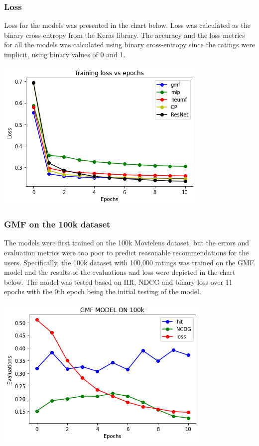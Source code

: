 \documentclass{article}
\begin{document}
\subsubsection{Loss}
Loss for the models was presented in the chart below. Loss was calculated as the binary cross-entropy from the Keras library. The accuracy and the loss metrics for all the models was calculated using binary cross-entropy since the ratings were implicit, using binary values of 0 and 1. \\
\begin{center}
\includegraphics[scale=0.5]{loss}
\end{center}

\subsubsection{GMF on the 100k dataset}
The models were first trained on the 100k Movielens dataset, but the errors and evaluation metrics were too poor to predict reasonable recommendations for the users. Specifically, the 100k dataset with 100,000 ratings was trained on the GMF model and the results of the evaluations and loss were depicted in the chart below.
The model was tested based on HR, NDCG and binary loss over 11 epochs with the 0th epoch being the initial testing of the model. \\
\begin{center}
\includegraphics[scale=0.5]{gmf100k}
\end{center}
\end{document}
